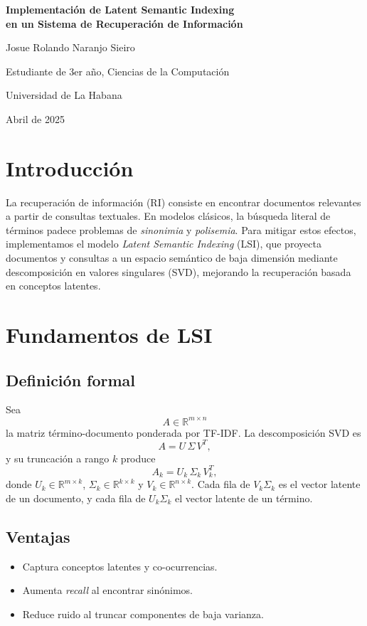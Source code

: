 \documentclass[12pt,a4paper]{report}
\begin{document}
\begin{titlepage}
  \centering
  \vspace*{2cm}
  {\Huge\bfseries Implementación de Latent Semantic Indexing \\[0.5em] en un Sistema de Recuperación de Información\par}
  \vspace{2cm}
  {\Large Josue Rolando Naranjo Sieiro\par}
  {\large Estudiante de 3er año, Ciencias de la Computación\par}
  {\large Universidad de La Habana\par}
  \vfill
  {\large Abril de 2025\par}
\end{titlepage}

\tableofcontents
\cleardoublepage

\chapter{Introducción}
La recuperación de información (RI) consiste en encontrar documentos relevantes a partir de consultas textuales. En modelos clásicos, la búsqueda literal de términos padece problemas de \emph{sinonimia} y \emph{polisemia}. Para mitigar estos efectos, implementamos el modelo \emph{Latent Semantic Indexing} (LSI), que proyecta documentos y consultas a un espacio semántico de baja dimensión mediante descomposición en valores singulares (SVD), mejorando la recuperación basada en conceptos latentes.

\chapter{Fundamentos de LSI}
\section{Definición formal}
Sea
\[
A\in\mathbb{R}^{m\times n}
\]
la matriz término-documento ponderada por TF-IDF. La descomposición SVD es
\[
A = U\,\Sigma\,V^T,
\]
y su truncación a rango \(k\) produce
\[
A_k = U_k\,\Sigma_k\,V_k^T,
\]
donde \(U_k\in\mathbb{R}^{m\times k}\), \(\Sigma_k\in\mathbb{R}^{k\times k}\) y \(V_k\in\mathbb{R}^{n\times k}\). Cada fila de \(V_k\Sigma_k\) es el vector latente de un documento, y cada fila de \(U_k\Sigma_k\) el vector latente de un término.

\section{Ventajas}
\begin{itemize}
  \item Captura conceptos latentes y co-ocurrencias.
  \item Aumenta \emph{recall} al encontrar sinónimos.
  \item Reduce ruido al truncar componentes de baja varianza.
\end{itemize}
\end{document}
